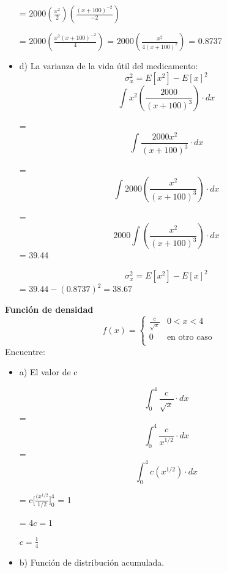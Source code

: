 \documentclass{../oxmathproblems}
\begin{document}
\begin{questions}
\begin{itemize}
= 
$2000 (\frac{x^2}{2})(\frac{(x+100)^{-2}}{-2})$

= $2000 (\frac{x^2(x+100)^{-2}}{4})$ =  $2000 (\frac{x^2}{4(x+100)^{2}})$ = 0.8737


\item  d) La varianza de la vida útil del medicamento: 
$$ \sigma_x^2 = E[x^2]-E[x]^2$$ 
\begin{equation}
\int x^2(\frac{2000}{(x+100)^3}) \cdot dx
\end{equation}

=  \begin{equation}
\int \frac{2000x^2}{(x+100)^3} \cdot dx
\end{equation}

=   \begin{equation}
\int 2000 (\frac{x^2}{(x+100)^3}) \cdot dx
\end{equation}

= \begin{equation}
2000 \int  (\frac{x^2}{(x+100)^3}) \cdot dx
\end{equation}
= 39.44

$$ \sigma_x^2 = E[x^2]-E[x]^2$$  = $39.44 - (0.8737)^2 = 38.67$
\end{itemize}

\miquestion\textbf{Función de densidad}
\[ 
f(x) = 
     \begin{cases}
       \frac{c}{\sqrt{x}} & 0 <x < 4 \\
       0 & \text{en otro caso} \\
     \end{cases}
\]
$$$$
Encuentre:  
\begin{itemize}
\item  a) El valor de c

\begin{equation}
\int_{0}^{4} \frac{c}{\sqrt{x}} \cdot dx
\end{equation}
= \begin{equation}
\int_{0}^{4} \frac{c}{x^{1/2}} \cdot dx
\end{equation}
= \begin{equation}
\int_{0}^{4} c(x^{1/2}) \cdot dx
\end{equation}

= c[$\frac{(x^{1/2}}{1/2}]^{4}_{0}$  = 1

= $ 4c = 1 $ 

$ c = \frac{1}{4} $ 

\item  b) Función de distribución acumulada. 


\end{itemize}
\end{questions}
\end{document}
